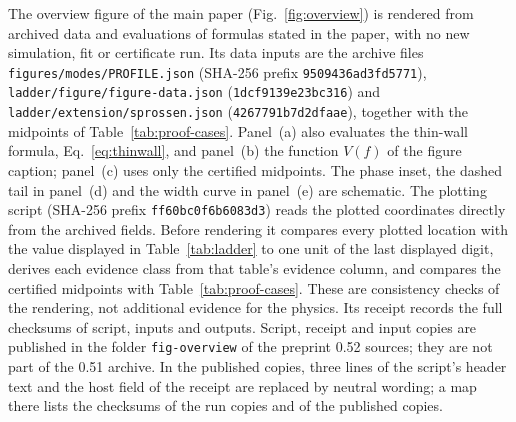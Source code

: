 \documentclass[a4paper,11pt]{article}
\begin{document}
{\sloppy
The overview figure of the main paper (Fig.~\ref{fig:overview}) is
rendered from archived data and evaluations of formulas stated in the
paper, with no new simulation, fit or certificate run. Its data inputs
are the archive files \texttt{figures/modes/PROFILE.json} (SHA-256
prefix \texttt{9509436ad3fd5771}), \texttt{ladder/figure/figure-data.json}
(\texttt{1dcf9139e23bc316}) and \texttt{ladder/extension/sprossen.json}
(\texttt{4267791b7d2dfaae}), together with the midpoints of
Table~\ref{tab:proof-cases}. Panel~(a) also evaluates the thin-wall
formula, Eq.~\eqref{eq:thinwall}, and panel~(b) the function $V(f)$
of the figure caption; panel~(c) uses only the certified midpoints.
The phase inset, the dashed tail in panel~(d) and the width curve in
panel~(e) are schematic. The plotting script (SHA-256 prefix
\texttt{ff60bc0f6b6083d3}) reads the plotted coordinates directly from
the archived fields. Before rendering it compares every plotted location
with the value displayed in Table~\ref{tab:ladder} to one unit of the
last displayed digit, derives each evidence class from that table's
evidence column, and compares the certified midpoints with
Table~\ref{tab:proof-cases}. These are consistency checks of the
rendering, not additional evidence for the physics. Its receipt records
the full checksums of script, inputs and outputs. Script, receipt and
input copies are published in the folder \texttt{fig-overview} of the
preprint 0.52 sources; they are not part of the 0.51 archive. In the
published copies, three lines of the script's header text and the host field
of the receipt are replaced by neutral wording; a map there lists the
checksums of the run copies and of the published copies.\par}

\end{document}

